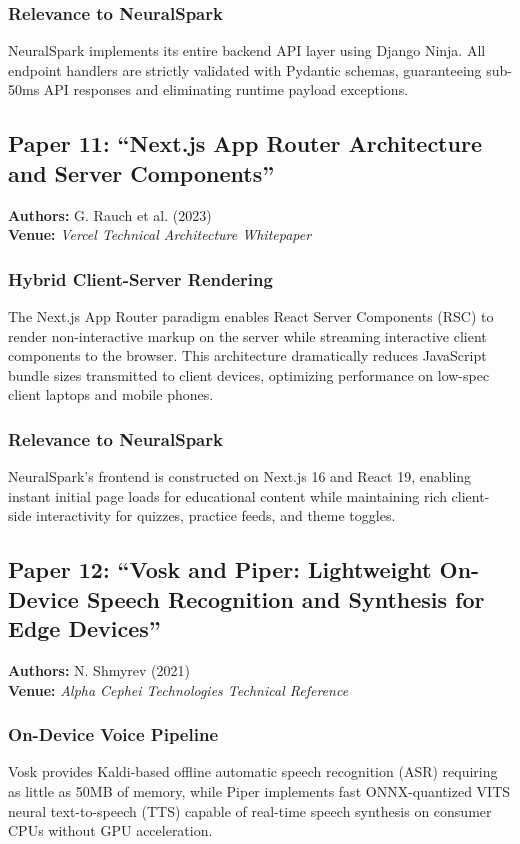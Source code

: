 \subsubsection{Relevance to NeuralSpark}
NeuralSpark implements its entire backend API layer using Django Ninja. All endpoint handlers are strictly validated with Pydantic schemas, guaranteeing sub-50ms API responses and eliminating runtime payload exceptions.

\subsection{Paper 11: ``Next.js App Router Architecture and Server Components''}
\textbf{Authors:} G. Rauch et al. (2023) \cite{rauch2023} \\
\textbf{Venue:} \textit{Vercel Technical Architecture Whitepaper}

\subsubsection{Hybrid Client-Server Rendering}
The Next.js App Router paradigm enables React Server Components (RSC) to render non-interactive markup on the server while streaming interactive client components to the browser. This architecture dramatically reduces JavaScript bundle sizes transmitted to client devices, optimizing performance on low-spec client laptops and mobile phones.

\subsubsection{Relevance to NeuralSpark}
NeuralSpark's frontend is constructed on Next.js 16 and React 19, enabling instant initial page loads for educational content while maintaining rich client-side interactivity for quizzes, practice feeds, and theme toggles.

\subsection{Paper 12: ``Vosk and Piper: Lightweight On-Device Speech Recognition and Synthesis for Edge Devices''}
\textbf{Authors:} N. Shmyrev (2021) \cite{shmyrev2021} \\
\textbf{Venue:} \textit{Alpha Cephei Technologies Technical Reference}

\subsubsection{On-Device Voice Pipeline}
Vosk provides Kaldi-based offline automatic speech recognition (ASR) requiring as little as 50MB of memory, while Piper implements fast ONNX-quantized VITS neural text-to-speech (TTS) capable of real-time speech synthesis on consumer CPUs without GPU acceleration.

